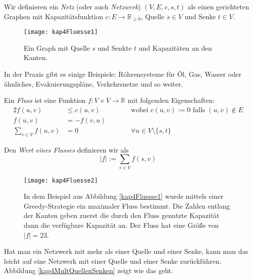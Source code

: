 \begin{Def}[Netz]
  \hspace{\parindent}Wir definieren ein \textit{Netz} (oder auch \textit{Netzwerk}) $(V, E, c, s, t)$ als einen gerichteten Graphen mit Kapazitätsfunktion $c: E \to \mathbb{R}_{\ge 0}$, Quelle $s \in V$ und Senke $t \in V$.
\end{Def}

\begin{figure}[htb]
  \centering
  \texttt{[image: kap4Fluesse1]}
  \caption{Ein Graph mit Quelle $s$ und Senkte $t$ und Kapazitäten an den Kanten.}
  \label{kap4Fluesse1}
\end{figure}

In der Praxis gibt es einige Beispiele: Röhrensysteme für Öl, Gas, Wasser oder ähnliches, Evakuierungspläne, Verkehrsnetze und so weiter.

\begin{Def}[Fluss]
\hspace{\parindent}Ein \textit{Fluss} ist eine Funktion $f: V \times V \to \mathbb{R}$ mit folgenden Eigenschaften:
\begin{alignat*}{2}
  f(u,v) & \le c(u,v) &\qquad& \text{wobei } c(u,v) := 0 \text{ falls } (u,v) \notin E\\
  f(u,v) & = -f(v,u) \\
  \sum_{v \in V} f(u,v) & = 0 && \forall u \in V \setminus \{s,t\}
\end{alignat*}
\end{Def}

\begin{Def}
  \hspace{\parindent}Den \textit{Wert eines Flusses} definieren wir als
  \[|f| := \sum_{v \in V} f(s,v)\]
\end{Def}

\begin{figure}[htb]
  \centering
  \texttt{[image: kap4Fluesse2]}
  \caption{In dem Beispiel aus Abbildung \vref{kap4Fluesse1} wurde mittels einer Greedy-Strategie ein maximaler Fluss bestimmt. Die Zahlen entlang der Kanten geben zuerst die durch den Fluss genutzte Kapazität dann die verfügbare Kapazität an. Der Fluss hat eine Größe von $|f| = 23$.}
  \label{kap4Fluesse2}
\end{figure}

Hat man ein Netzwerk mit mehr als einer Quelle und einer Senke, kann man das leicht auf eine Netzwerk mit einer Quelle und einer Senke zurückführen. Abbildung \vref{kap4MultQuellenSenken} zeigt wie das geht.

